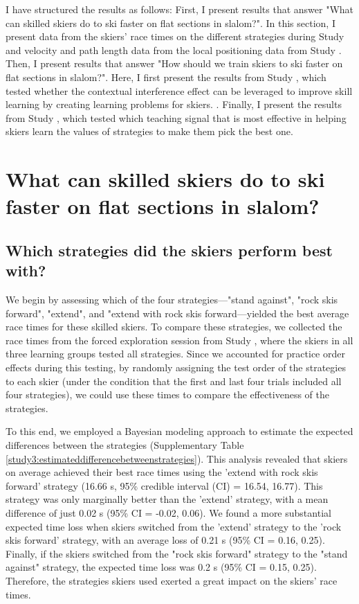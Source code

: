 I have structured the results as follows: First, I present results that answer "What can skilled skiers do to ski faster on flat sections in slalom?". In this section, I present data from the skiers' race times on the different strategies during Study  and velocity and path length data from the local positioning data from Study . Then, I present results that answer "How should we train skiers to ski faster on flat sections in slalom?". Here, I first present the results from Study , which tested whether the contextual interference effect can be leveraged to improve skill learning by creating learning problems for skiers.  . Finally, I present the results from Study , which tested which teaching signal that is most effective in helping skiers learn the values of strategies to make them pick the best one.  

\section{What can skilled skiers do to ski faster on flat sections in slalom?}


\subsection{Which strategies did the skiers perform best with?}\label{results_strategies}
We begin by assessing which of the four strategies—"stand against", "rock skis forward", "extend", and "extend with rock skis forward—yielded the best average race times for these skilled skiers. To compare these strategies, we collected the race times from the forced exploration session from Study , where the skiers in all three learning groups tested all strategies. Since we accounted for practice order effects during this testing, by randomly assigning the test order of the strategies to each skier (under the condition that the first and last four trials included all four strategies), we could use these times to compare the effectiveness of the strategies. 

To this end, we employed a Bayesian modeling approach to estimate the expected differences between the strategies (Supplementary Table \ref{study3:estimateddifferencebetweenstrategies}). This analysis revealed that skiers on average achieved their best race times using the 'extend with rock skis forward' strategy (16.66 s, 95\% credible interval (CI) = 16.54, 16.77). This strategy was only marginally better than the 'extend' strategy, with a mean difference of just 0.02 s (95\% CI = -0.02, 0.06).  We found a more substantial expected time loss when skiers switched from the 'extend' strategy to the 'rock skis forward' strategy, with an average loss of 0.21 s (95\% CI = 0.16, 0.25). Finally, if the skiers switched from the "rock skis forward" strategy to the "stand against" strategy, the expected time loss was 0.2 s (95\% CI = 0.15, 0.25). Therefore, the strategies skiers used exerted a great impact on the skiers' race times. 

